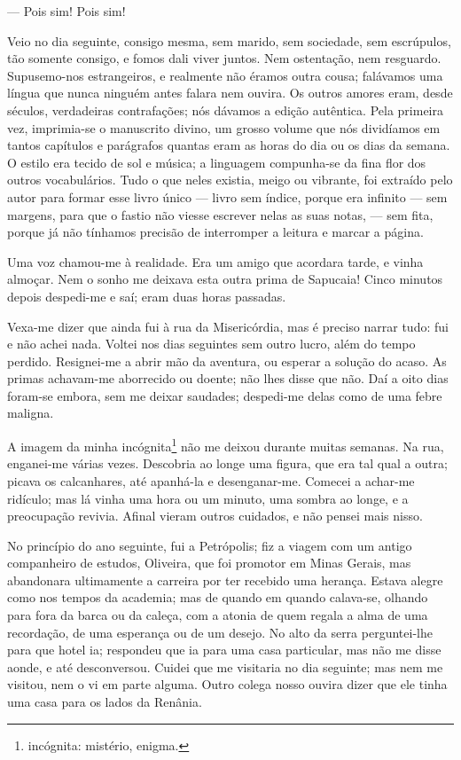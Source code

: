 --- Pois sim! Pois sim!

Veio no dia seguinte, consigo mesma, sem marido, sem sociedade, sem
escrúpulos, tão somente consigo, e fomos dali viver juntos. Nem
ostentação, nem resguardo. Supusemo-nos estrangeiros, e realmente não
éramos outra cousa; falávamos uma língua que nunca ninguém antes falara
nem ouvira. Os outros amores eram, desde séculos, verdadeiras
contrafações; nós dávamos a edição autêntica. Pela primeira vez,
imprimia-se o manuscrito divino, um grosso volume que nós dividíamos em
tantos capítulos e parágrafos quantas eram as horas do dia ou os dias da
semana. O estilo era tecido de sol e música; a linguagem compunha-se da
fina flor dos outros vocabulários. Tudo o que neles existia, meigo ou
vibrante, foi extraído pelo autor para formar esse livro único --- livro
sem índice, porque era infinito --- sem margens, para que o fastio não
viesse escrever nelas as suas notas, --- sem fita, porque já não
tínhamos precisão de interromper a leitura e marcar a página.

Uma voz chamou-me à realidade. Era um amigo que acordara tarde, e vinha
almoçar. Nem o sonho me deixava esta outra prima de Sapucaia! Cinco
minutos depois despedi-me e saí; eram duas horas passadas.

Vexa-me dizer que ainda fui à rua da Misericórdia, mas é preciso narrar
tudo: fui e não achei nada. Voltei nos dias seguintes sem outro lucro,
além do tempo perdido. Resignei-me a abrir mão da aventura, ou esperar a
solução do acaso. As primas achavam-me aborrecido ou doente; não lhes
disse que não. Daí a oito dias foram-se embora, sem me deixar saudades;
despedi-me delas como de uma febre maligna.

A imagem da minha incógnita\footnote{incógnita: mistério, enigma.} não
me deixou durante muitas semanas. Na rua, enganei-me várias vezes.
Descobria ao longe uma figura, que era tal qual a outra; picava os
calcanhares, até apanhá-la e desenganar-me. Comecei a achar-me ridículo;
mas lá vinha uma hora ou um minuto, uma sombra ao longe, e a preocupação
revivia. Afinal vieram outros cuidados, e não pensei mais nisso.

No princípio do ano seguinte, fui a Petrópolis; fiz a viagem com um
antigo companheiro de estudos, Oliveira, que foi promotor em Minas
Gerais, mas abandonara ultimamente a carreira por ter recebido uma
herança. Estava alegre como nos tempos da academia; mas de quando em
quando calava-se, olhando para fora da barca ou da caleça, com a atonia
de quem regala a alma de uma recordação, de uma esperança ou de um
desejo. No alto da serra perguntei-lhe para que hotel ia; respondeu que
ia para uma casa particular, mas não me disse aonde, e até desconversou.
Cuidei que me visitaria no dia seguinte; mas nem me visitou, nem o vi em
parte alguma. Outro colega nosso ouvira dizer que ele tinha uma casa
para os lados da Renânia.

